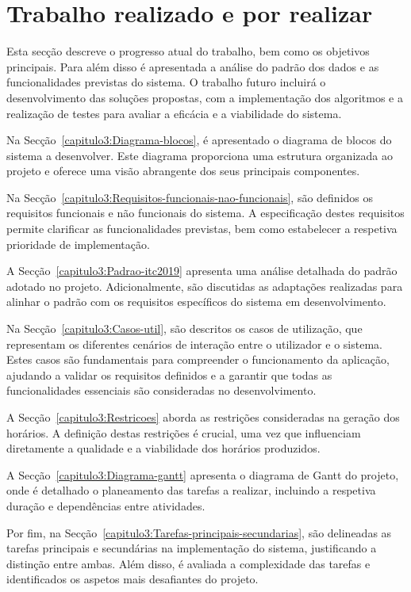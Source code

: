 % 
%  
%
\chapter{Trabalho realizado e por realizar}
\label{capitulo:trabalho-realizado-e-por-realizar}

Esta secção descreve o progresso atual do trabalho, bem como os objetivos principais. Para além disso é apresentada a análise do padrão dos dados e as funcionalidades previstas do sistema. O trabalho futuro incluirá o desenvolvimento das soluções propostas, com a implementação dos algoritmos e a realização de testes para avaliar a eficácia e a viabilidade do sistema.

Na Secção~\ref{capitulo3:Diagrama-blocos}, é apresentado o diagrama de blocos do sistema a desenvolver. Este diagrama proporciona uma estrutura organizada ao projeto e oferece uma visão abrangente dos seus principais componentes.

Na Secção~\ref{capitulo3:Requisitos-funcionais-nao-funcionais}, são definidos os requisitos funcionais e não funcionais do sistema. A especificação destes requisitos permite clarificar as funcionalidades previstas, bem como estabelecer a respetiva prioridade de implementação.

A Secção~\ref{capitulo3:Padrao-itc2019} apresenta uma análise detalhada do padrão adotado no projeto. Adicionalmente, são discutidas as adaptações realizadas para alinhar o padrão com os requisitos específicos do sistema em desenvolvimento.

Na Secção~\ref{capitulo3:Casos-util}, são descritos os casos de utilização, que representam os diferentes cenários de interação entre o utilizador e o sistema. Estes casos são fundamentais para compreender o funcionamento da aplicação, ajudando a validar os requisitos definidos e a garantir que todas as funcionalidades essenciais são consideradas no desenvolvimento.

A Secção~\ref{capitulo3:Restricoes} aborda as restrições consideradas na geração dos horários. A definição destas restrições é crucial, uma vez que influenciam diretamente a qualidade e a viabilidade dos horários produzidos.

A Secção~\ref{capitulo3:Diagrama-gantt} apresenta o diagrama de Gantt do projeto, onde é detalhado o planeamento das tarefas a realizar, incluindo a respetiva duração e dependências entre atividades.

Por fim, na Secção~\ref{capitulo3:Tarefas-principais-secundarias}, são delineadas as tarefas principais e secundárias na implementação do sistema, justificando a distinção entre ambas. Além disso, é avaliada a complexidade das tarefas e identificados os aspetos mais desafiantes do projeto.


